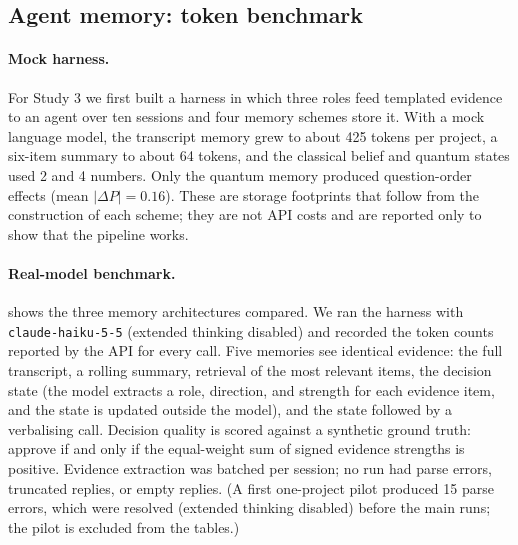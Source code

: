 \documentclass[11pt]{article}
\theoremstyle{definition}
\theoremstyle{remark}
\begin{document}
\subsection{Agent memory: token benchmark}
\label{sec:tokens}
\paragraph{Mock harness.} For Study 3 we first built a harness in which three roles feed templated evidence to an agent over ten sessions and four memory schemes store it. With a mock language model, the transcript memory grew to about 425 tokens per project, a six-item summary to about 64 tokens, and the classical belief and quantum states used 2 and 4 numbers. Only the quantum memory produced question-order effects (mean $|\Delta P|=0.16$). These are storage footprints that follow from the construction of each scheme; they are not API costs and are reported only to show that the pipeline works.

\paragraph{Real-model benchmark.}  shows the three memory architectures compared. We ran the harness with \texttt{claude-haiku-5-5} (extended thinking disabled) and recorded the token counts reported by the API for every call. Five memories see identical evidence: the full transcript, a rolling summary, retrieval of the most relevant items, the decision state (the model extracts a role, direction, and strength for each evidence item, and the state is updated outside the model), and the state followed by a verbalising call. Decision quality is scored against a synthetic ground truth: approve if and only if the equal-weight sum of signed evidence strengths is positive. Evidence extraction was batched per session; no run had parse errors, truncated replies, or empty replies. (A first one-project pilot produced 15 parse errors, which were resolved (extended thinking disabled) before the main runs; the pilot is excluded from the tables.)
\end{document}
